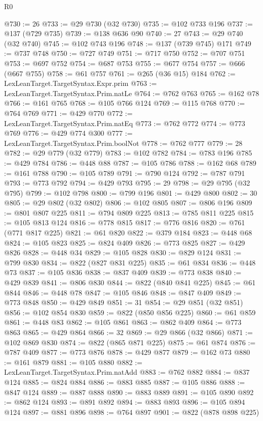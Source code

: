 \begin{lexlean}{R0}
\begin{coremodule}
{{{{{{{{{{{{{{{{{{{{{{{{{{{{{{{{{{{{{{{{{{{{{{{{{{{{{{{{{{{{{{{{{{{{{{{{{{{{{{{{{{{{{{@730 := 26
@733 := @29 @730 (@32 @730)
@735 := @102 @733 @196
@737 := @137 (@729 @735)
@739 := @138 @636 @90
@740 := 27
@743 := @29 @740 (@32 @740)
@745 := @102 @743 @196
@748 := @137 (@739 @745) @171
@749 := @737 @748
@750 := @727 @749
@751 := @717 @750
@752 := @707 @751
@753 := @697 @752
@754 := @687 @753
@755 := @677 @754
@757 := @666 (@667 @755)
@758 := @61 @757
@761 := @265 (@36 @15) @184
@762 := LexLeanTarget.TargetSyntax.Expr.prim
@763 := LexLeanTarget.TargetSyntax.Prim.natLe
@764 := @762 @763
@765 := @162 @78
@766 := @161 @765
@768 := @105 @766 @124
@769 := @115 @768
@770 := @764 @769
@771 := @429 @770
@772 := LexLeanTarget.TargetSyntax.Prim.natEq
@773 := @762 @772
@774 := @773 @769
@776 := @429 @774 @300
@777 := LexLeanTarget.TargetSyntax.Prim.boolNot
@778 := @762 @777
@779 := 28
@782 := @29 @779 (@32 @779)
@783 := @102 @782
@784 := @783 @196
@785 := @429 @784
@786 := @448 @88
@787 := @105 @786
@788 := @162 @68
@789 := @161 @788
@790 := @105 @789
@791 := @790 @124
@792 := @787 @791
@793 := @773 @792
@794 := @429 @793
@795 := 29
@798 := @29 @795 (@32 @795)
@799 := @102 @798
@800 := @799 @196
@801 := @429 @800
@802 := 30
@805 := @29 @802 (@32 @802)
@806 := @102 @805
@807 := @806 @196
@809 := @801 @807 @225
@811 := @794 @809 @225
@813 := @785 @811 @225
@815 := @105 @813 @124
@816 := @778 @815
@817 := @776 @816
@820 := @761 (@771 @817 @225)
@821 := @61 @820
@822 := @379 @184
@823 := @448 @68
@824 := @105 @823
@825 := @824 @409
@826 := @773 @825
@827 := @429 @826
@828 := @448 @34
@829 := @105 @828
@830 := @829 @124
@831 := @799 @830
@834 := @822 (@827 @831 @225)
@835 := @61 @834
@836 := @448 @73
@837 := @105 @836
@838 := @837 @409
@839 := @773 @838
@840 := @429 @839
@841 := @806 @830
@844 := @822 (@840 @841 @225)
@845 := @61 @844
@846 := @448 @78
@847 := @105 @846
@848 := @847 @409
@849 := @773 @848
@850 := @429 @849
@851 := 31
@854 := @29 @851 (@32 @851)
@856 := @102 @854 @830
@859 := @822 (@850 @856 @225)
@860 := @61 @859
@861 := @448 @83
@862 := @105 @861
@863 := @862 @409
@864 := @773 @863
@865 := @429 @864
@866 := 32
@869 := @29 @866 (@32 @866)
@871 := @102 @869 @830
@874 := @822 (@865 @871 @225)
@875 := @61 @874
@876 := @787 @409
@877 := @773 @876
@878 := @429 @877
@879 := @162 @73
@880 := @161 @879
@881 := @105 @880
@882 := LexLeanTarget.TargetSyntax.Prim.natAdd
@883 := @762 @882
@884 := @837 @124
@885 := @824 @884
@886 := @883 @885
@887 := @105 @886
@888 := @847 @124
@889 := @887 @888
@890 := @883 @889
@891 := @105 @890
@892 := @862 @124
@893 := @891 @892
@894 := @883 @893
@896 := @105 @894 @124
@897 := @881 @896
@898 := @764 @897
@901 := @822 (@878 @898 @225)
}}}}}}}}}}}}}}}}}}}}}}}}}}}}}}}}}}}}}}}}}}}}}}}}}}}}}}}}}}}}}}}}}}}}}}}}}}}}}}}}}}}}}}
\end{coremodule}
\end{lexlean}
